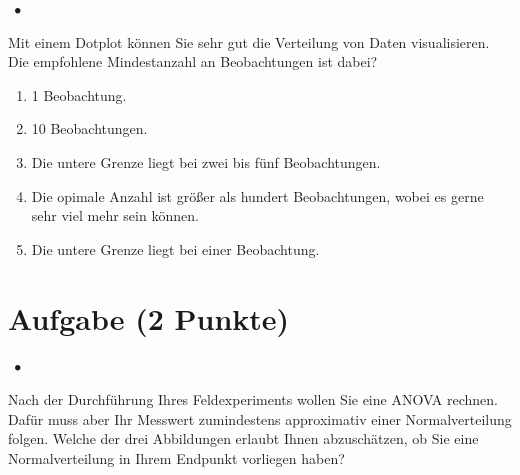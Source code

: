\documentclass[a4paper, 9pt]{scrartcl}\usepackage[]{graphicx}\usepackage[]{xcolor}
\begin{document}
\ifcollection
\begin{flushright}
\tiny\vspace{-2Ex}
\textbf{\examinhaltstart}
\exammodulestatversuch $\;\bullet$
\exammodulebiostat
\vspace{-1Ex}
\end{flushright}
\fi




Mit einem Dotplot  können Sie sehr gut die Verteilung von Daten visualisieren. Die empfohlene Mindestanzahl an Beobachtungen ist dabei?



\begin{enumerate}
\item [\textbf{A} \msquare] 1 Beobachtung.
\item [\textbf{B} \msquare] 10 Beobachtungen.
\item [\textbf{C} \msquare] Die untere Grenze liegt bei zwei bis fünf Beobachtungen.
\item [\textbf{D} \msquare] Die opimale Anzahl ist größer als hundert Beobachtungen, wobei es gerne sehr viel mehr sein können.
\item [\textbf{E} \msquare] Die untere Grenze liegt bei einer Beobachtung.
\end{enumerate}

\section{Aufgabe \hfill (2 Punkte)}

\ifcollection
\begin{flushright}
\tiny\vspace{-2Ex}
\textbf{\examinhaltstart}
\exammodulestatversuch $\;\bullet$
\exammodulebiostat
\vspace{-1Ex}
\end{flushright}
\fi




Nach der Durchführung Ihres Feldexperiments wollen Sie eine ANOVA rechnen. Dafür muss aber Ihr Messwert zumindestens approximativ einer Normalverteilung folgen. Welche der drei Abbildungen erlaubt Ihnen abzuschätzen, ob Sie eine Normalverteilung in Ihrem Endpunkt vorliegen haben?
\end{document}
